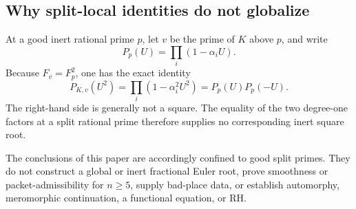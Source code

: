 \subsection{Why split-local identities do not globalize}

At a good inert rational prime \(p\), let \(v\) be the prime of \(K\)
above \(p\), and write
\[
P_p(U)=\prod_i(1-\alpha_iU).
\]
Because \(F_v=F_p^2\), one has the exact identity
\begin{equation}
P_{K,v}(U^2)
=\prod_i(1-\alpha_i^2U^2)
=P_p(U)P_p(-U).
\label{eq:inert-polynomial}
\end{equation}
The right-hand side is generally not a square.  The equality of the two
degree-one factors at a split rational prime therefore supplies no
corresponding inert square root.

The conclusions of this paper are accordingly confined to good split
primes.  They do not construct a global or inert fractional Euler root,
prove smoothness or packet-admissibility for \(n\ge5\), supply bad-place
data, or establish automorphy, meromorphic continuation, a functional
equation, or RH.
